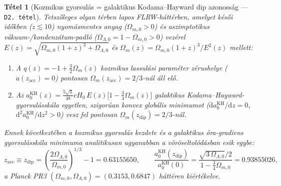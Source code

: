 \documentclass[11pt,a4paper]{article}
\newtheorem{theorem}{T\'etel}[section]
\theoremstyle{remark}
\begin{document}
\begin{theorem}[Kozmikus gyorsul\'as = galaktikus Kodama--Hayward dip azonoss\'ag --- \texttt{D2.\ t\'etel}]
\label{thm:d2}
Tetsz\H{o}leges olyan t\'erben lapos FLRW-h\'att\'erben, amelyet k\'es\H{o}i id\H{o}kben ($z \lesssim 10$) nyom\'asmentes anyag ($\Omega_{m,0} > 0$) \'es aszimptotikus v\'akuum-/kondenz\'atum-padl\'o ($\Omega_{\Lambda,0} = 1 - \Omega_{m,0} > 0$) vez\'erel $E(z) = \sqrt{\Omega_{m,0}(1+z)^3 + \Omega_{\Lambda,0}}$ \'es $\Omega_m(z) = \Omega_{m,0}(1+z)^3 / E^2(z)$ mellett:
\begin{enumerate}
  \item A $q(z) = -1 + \frac{3}{2}\Omega_m(z)$ kozmikus lassul\'asi param\'eter z\'erushelye ($\ddot{a}(z_{\mathrm{acc}}) = 0$) pontosan $\Omega_m(z_{\mathrm{acc}}) = 2/3$-n\'al \'all el\H{o}.
  \item Az $a_0^{\mathrm{KH}}(z) = \frac{5\sqrt{3}}{48}cH_0\,E(z)\bigl[1 - \frac{3}{4}\Omega_m(z)\bigr]$ galaktikus Kodama--Hayward-gyorsul\'assk\'ala egyetlen, szigor\'uan konvex glob\'alis minimumot ($\mathrm{d}a_0^{\mathrm{KH}}/\mathrm{d}z = 0$, $\mathrm{d}^2 a_0^{\mathrm{KH}}/\mathrm{d}z^2 > 0$) vesz fel pontosan $\Omega_m(z_{\mathrm{dip}}) = 2/3$-n\'al.
\end{enumerate}
Ennek k\"ovetkezt\'eben a kozmikus gyorsul\'as kezdete \'es a galaktikus \'ora-gradiens gyorsul\'assk\'ala minimuma \emph{analitikusan ugyanabban a v\"or\"oseltol\'od\'asban} esik egybe:
\begin{equation}
  z_{\mathrm{acc}} \equiv z_{\mathrm{dip}} = \left(\frac{2\Omega_{\Lambda,0}}{\Omega_{m,0}}\right)^{1/3} - 1 = 0.63155650, \qquad
  \frac{a_0^{\mathrm{KH}}(z_{\mathrm{dip}})}{a_0^{\mathrm{KH}}(0)} = \frac{\sqrt{3\,\Omega_{\Lambda,0}}/2}{1 - \frac{3}{4}\Omega_{m,0}} = 0.93855026,
  \label{eq:z_acc_equals_z_dip}
\end{equation}
a Planck PR3 $(\Omega_{m,0}, \Omega_{\Lambda,0}) = (0.3153, 0.6847)$ h\'att\'eren ki\'ert\'ekelve.
\end{theorem}
\end{document}
